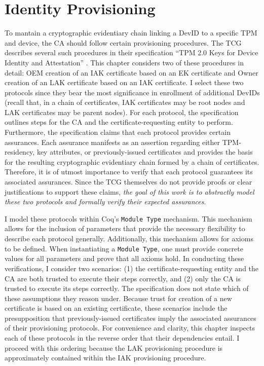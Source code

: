 \documentclass[runningheads]{llncs}
\begin{document}
\section{Identity Provisioning}
To mantain a cryptographic evidentiary chain linking a DevID to a specific TPM and device, the CA should follow certain provisioning procedures. The TCG describes several such procedures in their specification ``TPM 2.0 Keys for Device Identity and Attestation'' \cite{DevIDSpec-TCG}. 
This chapter considers two of these procedures in detail: OEM creation of an IAK certificate based on an EK certificate and Owner creation of an LAK certificate based on an IAK certificate. I select these two protocols since they bear the most significance in enrollment of additional DevIDs (recall that, in a chain of certificates, IAK certificates may be root nodes and LAK certificates may be parent nodes). For each protocol, the specification outlines steps for the CA and the certificate-requesting entity to perform.
Furthermore, the specification claims that each protocol provides certain assurances. Each assurance manifests as an assertion regarding either TPM-residency, key attributes, or previously-issued certificates and provides the basis for the resulting cryptographic evidentiary chain formed by a chain of certificates. Therefore, it is of utmost importance to verify that each protocol guarantees its associated assurances.
Since the TCG themselves do not provide proofs or clear justifications to support these claims, \textit{the goal of this work is to abstractly model these two protocols and formally verify their expected assurances}.


I model these protocols within Coq's \verb|Module Type| mechanism. This mechanism allows for the inclusion of parameters that provide the necessary flexibility to describe each protocol generally. Additionally, this mechanism allows for axioms to be defined. When instantiating a \verb|Module Type|, one must provide concrete values for all parameters and prove that all axioms hold.
In conducting these verifications, I consider two scenarios: (1) the certificate-requesting entity and the CA are both trusted to execute their steps correctly, and (2) only the CA is trusted to execute its steps correctly. The specification does not state which of these assumptions they reason under. 
Because trust for creation of a new certificate is based on an existing certificate, these scenarios include the presupposition that previously-issued certificates imply the associated assurances of their provisioning protocols. For convenience and clarity, this chapter inspects each of these protocols in the reverse order that their dependencies entail. I proceed with this ordering because the LAK provisioning procedure is approximately contained within the IAK provisioning procedure. 
\end{document}
